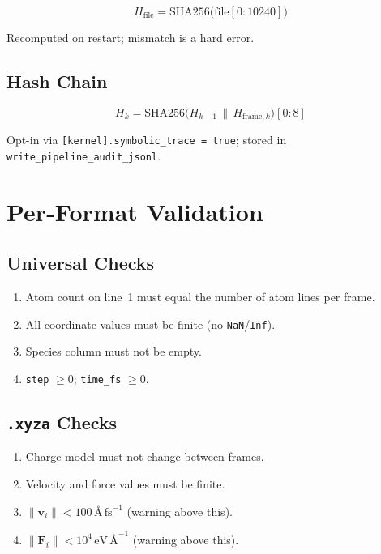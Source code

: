 \documentclass[11pt, a4paper, oneside]{article}
\newcommand{\ang}{\text{\AA}}
\newcommand{\fs}{\text{fs}}
\newcommand{\eV}{\text{eV}}
\begin{document}
\begin{equation}
  H_{\mathrm{file}} = \mathrm{SHA256}\bigl(\mathrm{file}[0:10240]\bigr)
  \label{eq:file_hash}
\end{equation}

Recomputed on restart; mismatch is a hard error.

\subsection{Hash Chain}
\label{sec:provenance_chain}

\begin{equation}
  H_k = \mathrm{SHA256}\bigl(H_{k-1} \,\|\, H_{\mathrm{frame},k}\bigr)[0:8]
  \label{eq:hash_chain}
\end{equation}

Opt-in via \texttt{[kernel].symbolic\_trace = true}; stored in
\texttt{write\_pipeline\_audit\_jsonl}.

\section{Per-Format Validation}
\label{sec:validation}

\subsection{Universal Checks}
\begin{enumerate}
  \item Atom count on line~1 must equal the number of atom lines per frame.
  \item All coordinate values must be finite (no \texttt{NaN}/\texttt{Inf}).
  \item Species column must not be empty.
  \item \texttt{step} $\geq 0$; \texttt{time\_fs} $\geq 0$.
\end{enumerate}

\subsection{\texttt{.xyza} Checks}
\begin{enumerate}
  \item Charge model must not change between frames.
  \item Velocity and force values must be finite.
  \item $\|\mathbf{v}_i\| < 100\,\ang\,\fs^{-1}$ (warning above this).
  \item $\|\mathbf{F}_i\| < 10^4\,\eV\,\ang^{-1}$ (warning above this).
\end{enumerate}
\end{document}

